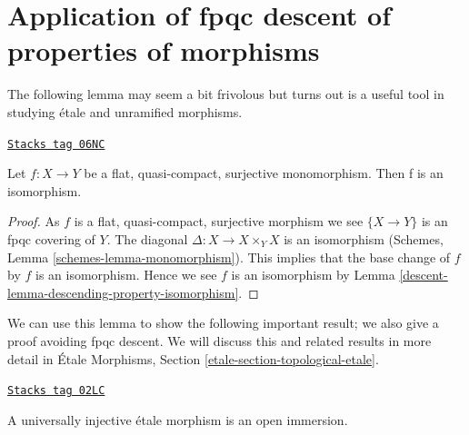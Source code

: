 \section{Application of fpqc descent of properties of morphisms}
\label{descent-section-application-descending-properties-morphisms}
The following lemma may seem a bit frivolous but turns out is a useful
tool in studying \'etale and unramified morphisms.

\begin{lemma}
\label{descent-lemma-flat-surjective-quasi-compact-monomorphism-isomorphism}
\href{https://stacks.math.columbia.edu/tag/06NC}{\texttt{Stacks tag 06NC}}

Let $f : X \to Y$ be a flat, quasi-compact, surjective monomorphism.
Then f is an isomorphism.
\end{lemma}

\begin{proof}

As $f$ is a flat, quasi-compact, surjective morphism
we see $\{X \to Y\}$ is an fpqc covering of $Y$.
The diagonal $\Delta : X \to X \times_Y X$ is an isomorphism
(Schemes, Lemma \ref{schemes-lemma-monomorphism}).
This implies that the base change of $f$ by $f$ is an
isomorphism. Hence we see $f$ is an isomorphism by
Lemma \ref{descent-lemma-descending-property-isomorphism}.
\end{proof}

We can use this lemma to show the following important result; we also
give a proof avoiding fpqc descent.
We will discuss this and related results in more detail in
\'Etale Morphisms, Section \ref{etale-section-topological-etale}.

\begin{lemma}
\label{descent-lemma-universally-injective-etale-open-immersion}
\href{https://stacks.math.columbia.edu/tag/02LC}{\texttt{Stacks tag 02LC}}

A universally injective \'etale morphism is an open immersion.
\end{lemma}


